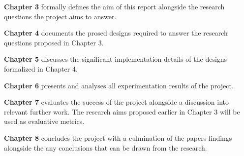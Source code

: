 \textbf{Chapter 3} formally defines the aim of this report alongside the research questions the project aims to answer.

\textbf{Chapter 4} documents the prosed designs required to answer the research questions proposed in Chapter 3.

\textbf{Chapter 5} discusses the significant implementation details of the designs formalized in Chapter 4.

\textbf{Chapter 6} presents and analyses all experimentation results of the project.

\textbf{Chapter 7} evaluates the success of the project alongside a discussion into relevant further work. The research aims proposed earlier in Chapter 3 will be used as evaluative metrics.

\textbf{Chapter 8} concludes the project with a culmination of the papers findings alongside the any conclusions that can be drawn from the research.